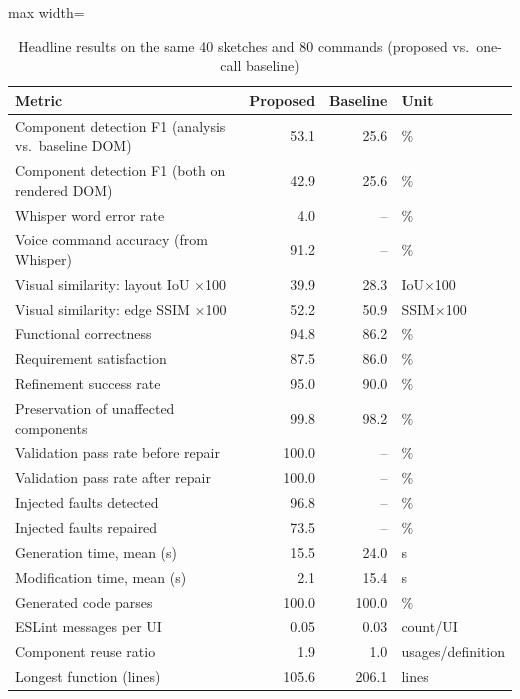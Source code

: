 \begin{table}[t]
\centering
\scriptsize
\caption{Headline results on the same 40 sketches and 80 commands (proposed vs.\ one-call baseline)}
\label{tab:headline}
\setlength{\tabcolsep}{3pt}
\begin{adjustbox}{max width=\columnwidth}
\begin{tabular}{lrrl}
\toprule
\textbf{Metric} & \textbf{Proposed} & \textbf{Baseline} & \textbf{Unit} \\
\midrule
Component detection F1 (analysis vs.\ baseline DOM) & 53.1 & 25.6 & \% \\
Component detection F1 (both on rendered DOM) & 42.9 & 25.6 & \% \\
Whisper word error rate & 4.0 & -- & \% \\
Voice command accuracy (from Whisper) & 91.2 & -- & \% \\
Visual similarity: layout IoU $\times$100 & 39.9 & 28.3 & IoU$\times$100 \\
Visual similarity: edge SSIM $\times$100 & 52.2 & 50.9 & SSIM$\times$100 \\
Functional correctness & 94.8 & 86.2 & \% \\
Requirement satisfaction & 87.5 & 86.0 & \% \\
Refinement success rate & 95.0 & 90.0 & \% \\
Preservation of unaffected components & 99.8 & 98.2 & \% \\
Validation pass rate before repair & 100.0 & -- & \% \\
Validation pass rate after repair & 100.0 & -- & \% \\
Injected faults detected & 96.8 & -- & \% \\
Injected faults repaired & 73.5 & -- & \% \\
Generation time, mean (s) & 15.5 & 24.0 & s \\
Modification time, mean (s) & 2.1 & 15.4 & s \\
Generated code parses & 100.0 & 100.0 & \% \\
ESLint messages per UI & 0.05 & 0.03 & count/UI \\
Component reuse ratio & 1.9 & 1.0 & usages/definition \\
Longest function (lines) & 105.6 & 206.1 & lines \\
\bottomrule
\end{tabular}
\end{adjustbox}
\end{table}
